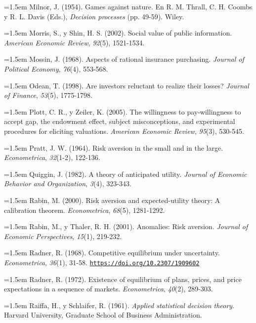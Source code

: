 \documentclass[10pt,a4paper]{article}
\begin{document}
\noindent\hangindent=1.5em Milnor, J. (1954). Games against nature. En R. M. Thrall, C. H. Coombs y R. L. Davis (Eds.), \textit{Decision processes} (pp. 49-59). Wiley.

\noindent\hangindent=1.5em Morris, S., y Shin, H. S. (2002). Social value of public information. \textit{American Economic Review}, \textit{92}(5), 1521-1534.

\noindent\hangindent=1.5em Mossin, J. (1968). Aspects of rational insurance purchasing. \textit{Journal of Political Economy}, \textit{76}(4), 553-568.

\noindent\hangindent=1.5em Odean, T. (1998). Are investors reluctant to realize their losses? \textit{Journal of Finance}, \textit{53}(5), 1775-1798.

\noindent\hangindent=1.5em Plott, C. R., y Zeiler, K. (2005). The willingness to pay-willingness to accept gap, the endowment effect, subject misconceptions, and experimental procedures for eliciting valuations. \textit{American Economic Review}, \textit{95}(3), 530-545.

\noindent\hangindent=1.5em Pratt, J. W. (1964). Risk aversion in the small and in the large. \textit{Econometrica}, \textit{32}(1-2), 122-136.

\noindent\hangindent=1.5em Quiggin, J. (1982). A theory of anticipated utility. \textit{Journal of Economic Behavior and Organization}, \textit{3}(4), 323-343.

\noindent\hangindent=1.5em Rabin, M. (2000). Risk aversion and expected-utility theory: A calibration theorem. \textit{Econometrica}, \textit{68}(5), 1281-1292.

\noindent\hangindent=1.5em Rabin, M., y Thaler, R. H. (2001). Anomalies: Risk aversion. \textit{Journal of Economic Perspectives}, \textit{15}(1), 219-232.

\noindent\hangindent=1.5em Radner, R. (1968). Competitive equilibrium under uncertainty. \textit{Econometrica}, \textit{36}(1), 31-58. \href{https://doi.org/10.2307/1909602}{\nolinkurl{https://doi.org/10.2307/1909602}}

\noindent\hangindent=1.5em Radner, R. (1972). Existence of equilibrium of plans, prices, and price expectations in a sequence of markets. \textit{Econometrica}, \textit{40}(2), 289-303.

\noindent\hangindent=1.5em Raiffa, H., y Schlaifer, R. (1961). \textit{Applied statistical decision theory}. Harvard University, Graduate School of Business Administration.
\end{document}
